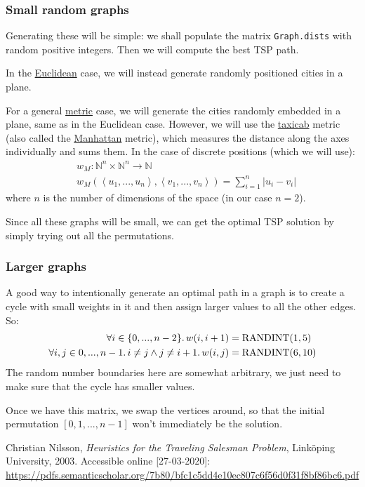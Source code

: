 \documentclass{article}
\newcommand{\randint}{\operatorname{RANDINT}}
\newcommand{\uu}[1]{\underline{#1}}
\newcommand{\py}[1]{\lstinline[language=Python]{#1}}
\begin{document}
\subsubsection{Small random graphs}

Generating these will be simple: we shall populate the matrix
\py{Graph.dists} with random positive integers. Then we will
compute the best TSP path.

In the \uu{Euclidean} case, we will instead generate randomly positioned
cities in a plane.

For a general \uu{metric} case, we will generate the cities randomly embedded
in a plane, same as in the Euclidean case. However, we will use
the \uu{taxicab} metric (also called the \uu{Manhattan} metric), which measures
the distance along the axes individually and sums them. In the case of discrete
positions (which we will use):
\begin{align*}
  & w_M: \mathbb{N}^n \times \mathbb{N}^n \to \mathbb{N} \\
  & w_M\left(\left<u_1,...,u_n\right>, \left<v_1,...,v_n\right>\right) = \sum_{i=1}^n \left|u_i - v_i\right|
\end{align*}
where $n$ is the number of dimensions of the space (in our case $n=2$).

Since all these graphs will be small, we can get the optimal TSP solution by
simply trying out all the permutations.

\subsubsection{Larger graphs}

A good way to intentionally generate an optimal path in a graph is to create
a cycle with small weights in it and then assign larger values to all the other
edges. So:
\begin{align*}\forall i\in\{0,...,n-2\}\ldotp w(i,i+1) & =\randint(1,5)\\
  \forall i,j\in{0,...,n-1}\ldotp i\ne j \wedge j\ne i+1 \ldotp
  w(i,j) & = \randint(6,10) \\
\end{align*}
The random number boundaries here are somewhat arbitrary, we just need to make
sure that the cycle has smaller values.

Once we have this matrix, we swap the vertices around, so that the initial
permutation $[0,1,...,n-1]$ won't immediately be the solution.



\begin{thebibliography}{9}
  Christian Nilsson,
  \textit{Heuristics for the Traveling Salesman Problem},
  Link\"oping University,
  2003.
  Accessible online [27-03-2020]: \url{https://pdfs.semanticscholar.org/7b80/bfc1c5dd4e10ec807c6f56d0f31f8bf86bc6.pdf}
\end{thebibliography}
\end{document}
